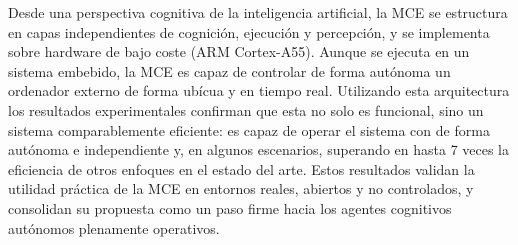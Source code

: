 Desde una perspectiva cognitiva de la inteligencia artificial, la MCE se
estructura en capas independientes de cognición, ejecución y percepción, y se
implementa sobre hardware de bajo coste (ARM Cortex-A55). Aunque se ejecuta en
un sistema embebido, la MCE es capaz de controlar de forma autónoma un ordenador
externo de forma ubícua y en tiempo real. Utilizando esta arquitectura 
los resultados experimentales confirman que esta no solo es funcional, 
sino un sistema comparablemente eficiente: es capaz de operar el sistema con
de forma autónoma e independiente y, en algunos escenarios, superando en 
hasta 7 veces la eficiencia de otros enfoques en el estado del arte. Estos resultados 
validan la utilidad práctica de la MCE en entornos reales, abiertos y
no controlados, y consolidan su propuesta como un paso firme hacia 
los agentes cognitivos autónomos plenamente operativos.

\begingroup
\setlength{\parskip}{0pt}
\setlength{\parindent}{3pt}
\tableofcontents
\endgroup


